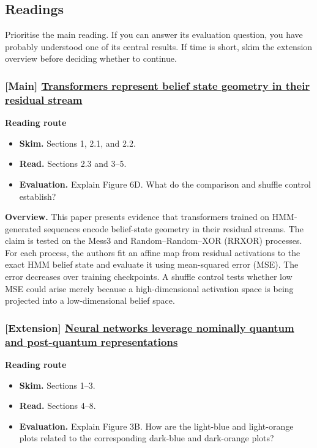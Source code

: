 \documentclass[11pt]{article}
\begin{document}
\subsection{Readings}
Prioritise the main reading. If you can answer its evaluation question, you
have probably understood one of its central results. If time is short, skim
the extension overview before deciding whether to continue.

\subsubsection{[Main] \href{https://arxiv.org/pdf/2405.15943}{Transformers represent belief state geometry in their residual stream}}
  \textbf{Reading route}
\begin{itemize}
    \item \textbf{Skim.} Sections 1, 2.1, and 2.2.
    \item \textbf{Read.} Sections 2.3 and 3--5.
    \item \textbf{Evaluation.} Explain Figure 6D. What do the comparison and
      shuffle control establish?
  \end{itemize}

  \textbf{Overview.} This paper presents evidence that transformers trained on
  HMM-generated sequences encode belief-state geometry in their residual
  streams. The claim is tested on the Mess3 and Random--Random--XOR (RRXOR)
  processes. For each process, the authors fit an affine map from residual
  activations to the exact HMM belief state and evaluate it using mean-squared
  error (MSE). The error decreases over training checkpoints. A shuffle
  control tests whether low MSE could arise merely because a high-dimensional
  activation space is being projected into a low-dimensional belief space.

\subsubsection{[Extension] \href{https://arxiv.org/pdf/2507.07432}{Neural networks leverage nominally quantum and post-quantum representations}}
  \textbf{Reading route}
\begin{itemize}
    \item \textbf{Skim.} Sections 1--3.
    \item \textbf{Read.} Sections 4--8.
    \item \textbf{Evaluation.} Explain Figure 3B. How are the light-blue and light-orange
      plots related to the corresponding dark-blue and dark-orange plots?
  \end{itemize}
\end{document}
